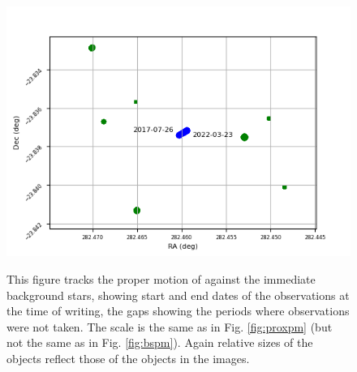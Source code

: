 {\begin{figure}[!htbp]
\begin{center}
\includegraphics[scale=0.7]{images/pmross.png} \\
\end{center}
\caption{This figure tracks the proper motion of {\ross} against the immediate
background stars, showing start and end dates of the observations at the time
of writing, the gaps showing the periods where observations were not taken.
The scale is the same as in Fig. \ref{fig:proxpm} (but not the same as in Fig.
\ref{fig:bspm}). Again relative sizes of the objects reflect those of the
objects in the images.} \protect\label{fig:rosspm}
\end{figure}
}
\clearpage
